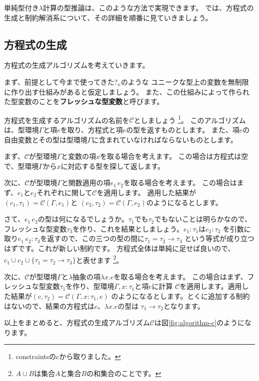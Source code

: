単純型付き$\lambda$計算の型推論は、このような方法で実現できます。
では、方程式の生成と制約解消系について、その詳細を順番に見ていきましょう。

\subsection{方程式の生成}

方程式の生成アルゴリズムを考えていきます。

まず、前提として今まで使ってきた$?_n$のような
ユニークな型上の変数を無制限に作り出す仕組みがあると仮定しましょう。
また、この仕組みによって作られた型変数のことを\textbf{フレッシュな型変数}と呼びます。

方程式を生成するアルゴリズムの名前を$\mathcal C$としましょう
\footnote{constraintsのcから取りました。}。
このアルゴリズムは、型環境$\Gamma$と項$e$を取り、方程式と項$e$の型を返すものとします。
また、項$e$の自由変数とその型は型環境$\Gamma$に含まれていなければならないものとします。

まず、$\mathcal C$が型環境$\Gamma$と変数の項$x$を取る場合を考えます。
この場合は方程式は空で、型環境$\Gamma$から$x$に対応する型を探して返します。

次に、$\mathcal C$が型環境$\Gamma$と関数適用の項$e_1 \, e_2$を取る場合を考えます。
この場合はまず、$e_1$と$e_2$それぞれに関して$\mathcal C$を適用します。
適用した結果が$(c_1, \tau_1) = \mathcal{C}(\Gamma, e_1)$と
$(c_2, \tau_2) = \mathcal{C}(\Gamma, e_2)$のようになるとします。

さて、$e_1 \, e_2$の型は何になるでしょうか。$\tau_1$でも$\tau_2$でもないことは明らかなので、
フレッシュな型変数$\tau_3$を作り、これを結果としましょう。$e_1 : \tau_1$は$e_2 : \tau_2$
を引数に取り$e_1 \, e_2 : \tau_3$を返すので、この三つの型の間に$\tau_1 = \tau_2 \to \tau_3$
という等式が成り立つはずです。これが新しい制約です。
方程式全体は単純に足せば良いので、$c_1 \cup c_2 \cup \{\tau_1 = \tau_2 \to \tau_3\}$と表せます
\footnote{$A \cup B$は集合$A$と集合$B$の和集合のことです。}。

次に、$\mathcal C$が型環境$\Gamma$と$\lambda$抽象の項$\lambda x . e$を取る場合を考えます。
この場合はまず、フレッシュな型変数$\tau_1$を作り、型環境$\Gamma, x : \tau_1$と項$e$に計算
$\mathcal C$を適用します。適用した結果が$(c, \tau_2) = \mathcal{C}(\Gamma, x : \tau_1, e)$
のようになるとします。とくに追加する制約はないので、結果の方程式は$c$、$\lambda x . e$の型は
$\tau_1 \to \tau_2$となります。

以上をまとめると、方程式の生成アルゴリズム$\mathcal C$は図\ref{fig:algorithm-c}のようになります。

